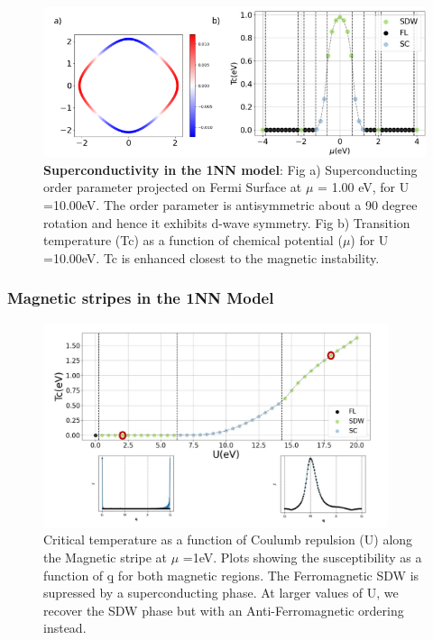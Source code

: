 \documentclass[12pt]{article}
\begin{document}
\begin{figure}[htbp]  %
    \centering
    \includegraphics[width=1.0\textwidth]{1NNSC.png}  %
    \caption{\textbf{Superconductivity in the 1NN model}:  
    Fig a) Superconducting order parameter projected on Fermi Surface at $\mu$ = 1.00 eV, 
    for U =10.00eV. The order parameter is antisymmetric about a 90 degree rotation and hence
    it exhibits d-wave symmetry. 
    Fig b) Transition temperature (Tc) as a function of chemical potential ($\mu$) for U =10.00eV.
    Tc is enhanced closest to the magnetic instability.   
    }
    \label{fig:1NNSC}
\end{figure}



\subsubsection{Magnetic stripes in the 1NN Model}

\begin{figure}[htbp]  %
    \centering
    \includegraphics[width=0.9\textwidth]{1NN_SDW_stripes.png}  %
    \caption{Critical temperature as a function of Coulumb repulsion (U) along the Magnetic stripe at $\mu$ =1eV. Plots showing the susceptibility as a function of \b{q} for both magnetic regions. The Ferromagnetic SDW is supressed by a superconducting phase. At larger values of U, we recover the SDW phase but with an Anti-Ferromagnetic ordering instead.  }
    \label{fig:1NN_stripes}
\end{figure}
\end{document}
